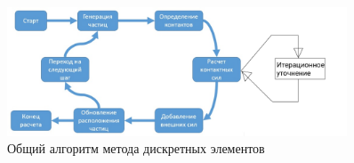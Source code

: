 \documentclass[c]{beamer}  %
\begin{document}



\begin{frame}
\frametitle{\insertsection} 
\framesubtitle{\insertsubsection}

\begin{figure}[h!]
	\centering
	\includegraphics[width=0.9\textwidth]{algorithm}
	\caption{Общий алгоритм метода дискретных элементов}
\end{figure} 
\end{frame}
\end{document}
